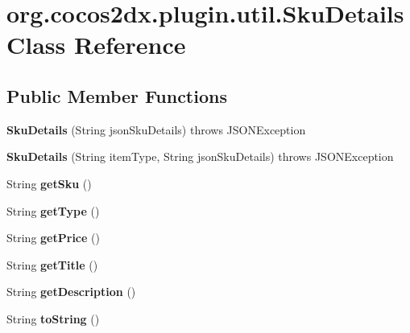 \hypertarget{classorg_1_1cocos2dx_1_1plugin_1_1util_1_1SkuDetails}{}\section{org.\+cocos2dx.\+plugin.\+util.\+Sku\+Details Class Reference}
\label{classorg_1_1cocos2dx_1_1plugin_1_1util_1_1SkuDetails}
\subsection*{Public Member Functions}
\begin{DoxyCompactItemize}
\item 
\mbox{\label{classorg_1_1cocos2dx_1_1plugin_1_1util_1_1SkuDetails_a48918cafc0057ad7a2c996d0473936f1}} 
{\bfseries Sku\+Details} (String json\+Sku\+Details)  throws J\+S\+O\+N\+Exception 
\item 
\mbox{\label{classorg_1_1cocos2dx_1_1plugin_1_1util_1_1SkuDetails_ab802d0718cd358007fc523ecdcba95ab}} 
{\bfseries Sku\+Details} (String item\+Type, String json\+Sku\+Details)  throws J\+S\+O\+N\+Exception 
\item 
\mbox{\label{classorg_1_1cocos2dx_1_1plugin_1_1util_1_1SkuDetails_a32159566adfdd08d2961099b7047d43d}} 
String {\bfseries get\+Sku} ()
\item 
\mbox{\label{classorg_1_1cocos2dx_1_1plugin_1_1util_1_1SkuDetails_a69d9697672c4897ae4eedca41e256c77}} 
String {\bfseries get\+Type} ()
\item 
\mbox{\label{classorg_1_1cocos2dx_1_1plugin_1_1util_1_1SkuDetails_af305df889aa98d7c6adf5cc78530d741}} 
String {\bfseries get\+Price} ()
\item 
\mbox{\label{classorg_1_1cocos2dx_1_1plugin_1_1util_1_1SkuDetails_aa9f9d60f07a3285fb8fdfa130cb7d1a8}} 
String {\bfseries get\+Title} ()
\item 
\mbox{\label{classorg_1_1cocos2dx_1_1plugin_1_1util_1_1SkuDetails_a19f2727b50f947fc9857a23c1903fe58}} 
String {\bfseries get\+Description} ()
\item 
\mbox{\label{classorg_1_1cocos2dx_1_1plugin_1_1util_1_1SkuDetails_ac78ff42ef85f4b1dafbaacb65d932da8}} 
String {\bfseries to\+String} ()
\end{DoxyCompactItemize}



